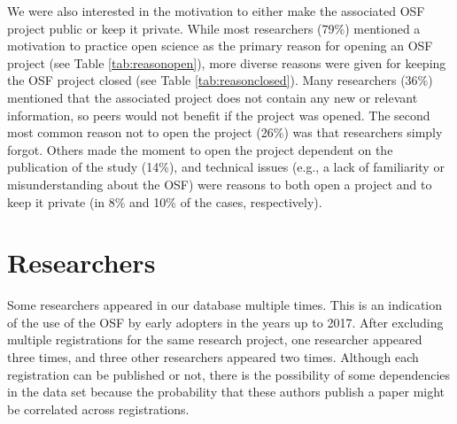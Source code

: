 \documentclass[
  ,jou, a4paper,floatsintext]{apa6}
\begin{document}
We were also interested in the motivation to either make the associated OSF project public or keep it private. While most researchers (79\%) mentioned a motivation to practice open science as the primary reason for opening an OSF project (see Table \ref{tab:reasonopen}), more diverse reasons were given for keeping the OSF project closed (see Table \ref{tab:reasonclosed}). Many researchers (36\%) mentioned that the associated project does not contain any new or relevant information, so peers would not benefit if the project was opened. The second most common reason not to open the project (26\%) was that researchers simply forgot. Others made the moment to open the project dependent on the publication of the study (14\%), and technical issues (e.g., a lack of familiarity or misunderstanding about the OSF) were reasons to both open a project and to keep it private (in 8\% and 10\% of the cases, respectively).

\section{Researchers}\label{researchers}

Some researchers appeared in our database multiple times. This is an indication of the use of the OSF by early adopters in the years up to 2017. After excluding multiple registrations for the same research project, one researcher appeared three times, and three other researchers appeared two times. Although each registration can be published or not, there is the possibility of some dependencies in the data set because the probability that these authors publish a paper might be correlated across registrations.
\end{document}
